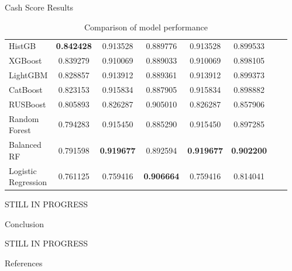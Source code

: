 \documentclass[final]{beamer}
\newlength{\sepwidth}
\newlength{\colwidth}
\newcommand{\separatorcolumn}{\begin{column}{\sepwidth}\end{column}}
\begin{document}
\begin{frame}[t]
\begin{columns}[t]
\begin{column}{\colwidth}
\begin{exampleblock}{Cash Score Results}
\begin{table}[H]
\begin{tabular}{|l|c|c|c|c|c|c|c|}
        HistGB & \textbf{0.842428} & 0.913528 & 0.889776 & 0.913528 & 0.899533 \\
        XGBoost & 0.839279 & 0.910069 & 0.889033 & 0.910069 & 0.898105 \\
        LightGBM & 0.828857 & 0.913912 & 0.889361 & 0.913912 & 0.899373 \\
        CatBoost & 0.823153 & 0.915834 & 0.887905 & 0.915834 & 0.898882 \\
        RUSBoost & 0.805893 & 0.826287 & 0.905010 & 0.826287 & 0.857906 \\
        Random Forest & 0.794283 & 0.915450 & 0.885290 & 0.915450 & 0.897285 \\
        Balanced RF & 0.791598 & \textbf{0.919677} & 0.892594 & \textbf{0.919677} & \textbf{0.902200} \\
        Logistic Regression & 0.761125 & 0.759416 & \textbf{0.906664} & 0.759416 & 0.814041 \\
        \hline
    \end{tabular}
    \caption{Comparison of model performance}
    \end{table}

    STILL IN PROGRESS

  \end{exampleblock}

  \begin{block}{Conclusion}

    STILL IN PROGRESS

  \end{block}

  \begin{block}{References}

    \nocite{*}

  \end{block}

\end{column}

\separatorcolumn
\end{columns}
\end{frame}
\end{document}
